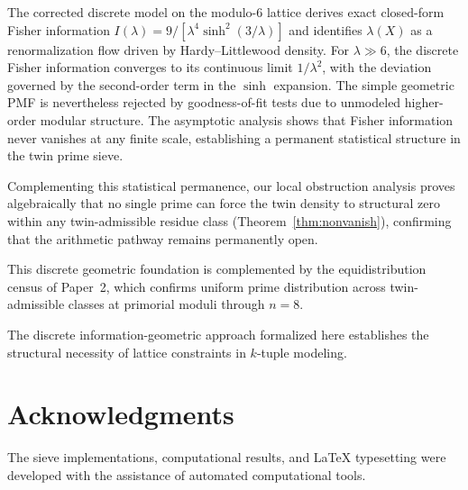 \documentclass[11pt]{article}
\begin{document}
The corrected discrete model on the modulo-6 lattice derives exact closed-form Fisher information $I(\lambda) = 9/[\lambda^4 \sinh^2(3/\lambda)]$ and identifies $\lambda(X)$ as a renormalization flow driven by Hardy--Littlewood density. For $\lambda \gg 6$, the discrete Fisher information converges to its continuous limit $1/\lambda^2$, with the deviation governed by the second-order term in the $\sinh$ expansion. The simple geometric PMF is nevertheless rejected by goodness-of-fit tests due to unmodeled higher-order modular structure. The asymptotic analysis shows that Fisher information never vanishes at any finite scale, establishing a permanent statistical structure in the twin prime sieve.

Complementing this statistical permanence, our local obstruction analysis proves algebraically that no single prime can force the twin density to structural zero within any twin-admissible residue class (Theorem~\ref{thm:nonvanish}), confirming that the arithmetic pathway remains permanently open.

This discrete geometric foundation is complemented by the equidistribution census of Paper~2, which confirms uniform prime distribution across twin-admissible classes at primorial moduli through $n=8$.

The discrete information-geometric approach formalized here establishes the structural necessity of lattice constraints in $k$-tuple modeling.

\section*{Acknowledgments}

The sieve implementations, computational results, and LaTeX typesetting were developed with the assistance of automated computational tools.
\end{document}
